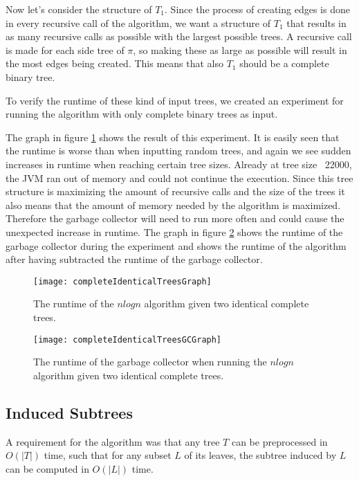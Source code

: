 Now let's consider the structure of $T_1$. Since the process of creating edges is done in every recursive call of the algorithm, we want a structure of $T_1$ that results in as many recursive calls as possible with the largest possible trees. A recursive call is made for each side tree of $\pi$, so making these as large as possible will result in the most edges being created. This means that also $T_1$ should be a complete binary tree.

To verify the runtime of these kind of input trees, we created an experiment for running the algorithm with only complete binary trees as input. 

The graph in figure \ref{completeIdenticalTreesGraph}  shows the result of this experiment. It is easily seen that the runtime is worse than when inputting random trees, and again we see sudden increases in runtime when reaching certain tree sizes. Already at tree size ~22000, the JVM ran out of memory and could not continue the execution. Since this tree structure is maximizing the amount of recursive calls and the size of the trees it also means that the amount of memory needed by the algorithm is maximized. Therefore the garbage collector will need to run more often and could cause the unexpected increase in runtime. The graph in figure \ref{completeIdenticalTreesGCGraph}  shows the runtime of the garbage collector during the experiment and  shows the runtime of the algorithm after having subtracted the runtime of the garbage collector. 

\begin{figure}
	\label{completeIdenticalTreesGraph}
	\texttt{[image: completeIdenticalTreesGraph]}
	\caption{The runtime of the $nlogn$ algorithm given two identical complete trees.}
\end{figure}

\begin{figure}
	\label{completeIdenticalTreesGCGraph}
	\texttt{[image: completeIdenticalTreesGCGraph]}
	\caption{The runtime of the garbage collector when running the $nlogn$ algorithm given two identical complete trees.}
\end{figure}


\subsection{Induced Subtrees}
A requirement for the algorithm was that any tree $T$ can be preprocessed in $O(|T|)$ time, such that for any subset $L$ of its leaves, the subtree induced by $L$ can be computed in $O(|L|)$ time.

